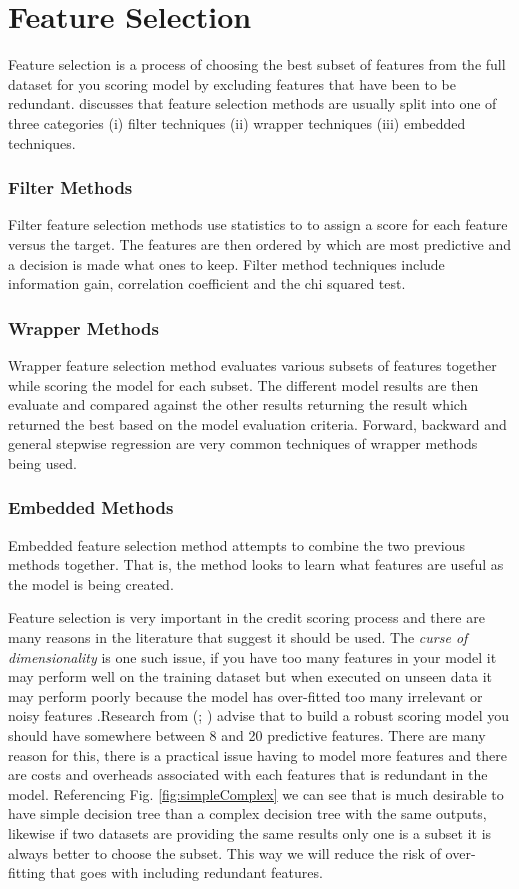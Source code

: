\section{Feature Selection}
Feature selection is a process of choosing the best subset of features from the full dataset for you scoring model by excluding features that have been to be redundant. \cite{guyon_introduction_2003} discusses that feature selection methods are usually split into one of three categories (i) filter techniques (ii) wrapper techniques (iii) embedded techniques. 

\subsubsection{Filter Methods}
Filter feature selection methods use statistics to to assign a score for each feature versus the target. The features are then ordered by which are most predictive and a decision is made what ones to keep. Filter method techniques include information gain, correlation coefficient and the chi squared test.

\subsubsection{Wrapper Methods}
Wrapper feature selection method evaluates various subsets of features together while scoring the model for each subset. The different model results are then evaluate and compared against the other results returning the result which returned the best based on the model evaluation criteria. Forward, backward and general stepwise regression are very common techniques of wrapper methods being used.

\subsubsection{Embedded Methods}
Embedded feature selection method attempts to combine the two previous methods together. That is, the method looks to learn what features are useful as the model is being created. 

Feature selection is very important in the credit scoring process and there are many reasons in the literature that suggest it should be used. The \textit{curse of dimensionality} is one such issue, if you have too many features in your model it may perform well on the training dataset but when executed on unseen data it may perform poorly because the model has over-fitted too many irrelevant or noisy features \citep{loughrey_overfitting_2005}.Research from (\cite{thomas_consumer_2009}; \cite{mays_credit_2004})  advise that to build a robust scoring model you should have somewhere between 8 and 20 predictive features. There are many reason for this, there is a practical issue having to model more features and there are costs and overheads associated with each features that is redundant in the model. Referencing Fig. \ref{fig:simpleComplex} we can see that is much desirable to have simple decision tree than a complex decision tree with the same outputs, likewise if two datasets are providing the same results only one is a subset it is always better to choose the subset. This way we will reduce the risk of over-fitting that goes with including redundant features.

